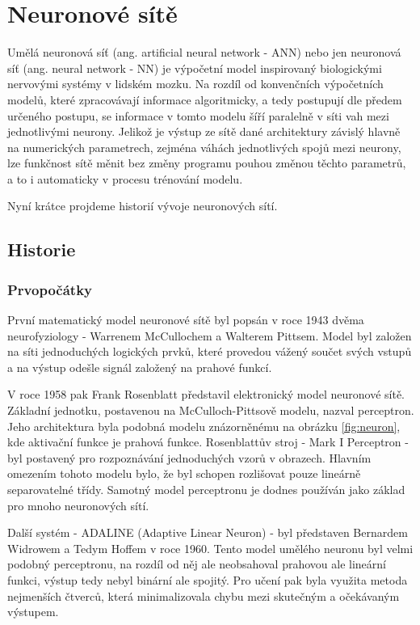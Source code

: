 \chapter{Neuronové sítě}
\label{sec:NN}

Umělá neuronová síť (ang. artificial neural network - ANN) nebo jen neuronová
síť (ang. neural network - NN) je výpočetní model inspirovaný biologickými
nervovými systémy v lidském mozku. Na rozdíl od konvenčních výpočetních modelů,
které zpracovávají informace algoritmicky, a tedy postupují dle předem určeného
postupu, se informace v tomto modelu šíří paralelně v síti vah mezi
jednotlivými neurony. Jelikož je výstup ze sítě dané architektury závislý
hlavně na numerických parametrech, zejména váhách jednotlivých spojů mezi
neurony, lze funkčnost sítě měnit bez změny programu pouhou změnou těchto
parametrů, a to i automaticky v procesu trénování modelu.

Nyní krátce projdeme historií vývoje neuronových sítí.

\section{Historie}
\label{sec:NN_History}

\subsection{Prvopočátky}
První matematický model neuronové sítě byl popsán v roce 1943 dvěma
neurofyziology - Warrenem McCullochem a Walterem Pittsem. \cite{McCulloch1943}
Model byl založen na síti jednoduchých logických prvků, které provedou vážený
součet svých vstupů a na výstup odešle signál založený na prahové funkcí.

V roce 1958 pak Frank Rosenblatt představil elektronický model neuronové sítě.
Základní jednotku, postavenou na McCulloch-Pittsově modelu, nazval perceptron.
\cite{Rosenblatt1958} Jeho architektura byla podobná modelu znázorněnému na
obrázku \ref{fig:neuron}, kde aktivační funkce je prahová funkce. Rosenblattův
stroj - Mark I Perceptron - byl postavený pro rozpoznávání jednoduchých vzorů v
obrazech. Hlavním omezením tohoto modelu bylo, že byl schopen rozlišovat pouze
lineárně separovatelné třídy. Samotný model perceptronu je dodnes používán jako
základ pro mnoho neuronových sítí.

Další systém - ADALINE (Adaptive Linear Neuron) - byl představen Bernardem
Widrowem a Tedym Hoffem v roce 1960. Tento model umělého neuronu byl velmi
podobný perceptronu, na rozdíl od něj ale neobsahoval prahovou ale lineární
funkci, výstup tedy nebyl binární ale spojitý. Pro učení pak byla využita
metoda nejmenších čtverců, která minimalizovala chybu mezi skutečným a
očekávaným výstupem. \cite{nn_history}

